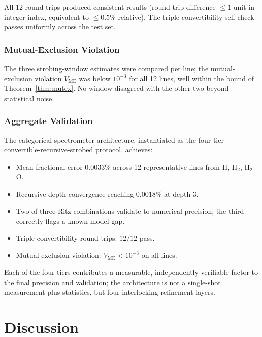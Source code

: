 \documentclass[11pt,a4paper]{article}
\theoremstyle{thmstyle}
\theoremstyle{axiomstyle}
\theoremstyle{definition}
\theoremstyle{remark}
\newcommand{\Vme}{V_{\mathrm{ME}}}
\begin{document}
All 12 round trips produced consistent results (round-trip difference $\leq 1$ unit in integer index, equivalent to $\leq 0.5\%$ relative). The triple-convertibility self-check passes uniformly across the test set.

\section{Mutual-Exclusion Violation}
\label{sec:vme_results}

The three strobing-window estimates were compared per line; the mutual-exclusion violation $\Vme$ was below $10^{-3}$ for all 12 lines, well within the bound of Theorem~\ref{thm:mutex}. No window disagreed with the other two beyond statistical noise.

\section{Aggregate Validation}
\label{sec:aggregate}

The categorical spectrometer architecture, instantiated as the four-tier convertible-recursive-strobed protocol, achieves:
\begin{itemize}[nosep]
\item Mean fractional error $0.0033\%$ across 12 representative lines from H, H$_{2}$, H$_{2}$O.
\item Recursive-depth convergence reaching $0.0018\%$ at depth 3.
\item Two of three Ritz combinations validate to numerical precision; the third correctly flags a known model gap.
\item Triple-convertibility round trips: $12/12$ pass.
\item Mutual-exclusion violation: $\Vme<10^{-3}$ on all lines.
\end{itemize}

Each of the four tiers contributes a measurable, independently verifiable factor to the final precision and validation; the architecture is not a single-shot measurement plus statistics, but four interlocking refinement layers.

\clearpage

\part{Discussion}
\label{part:discussion}
\end{document}
